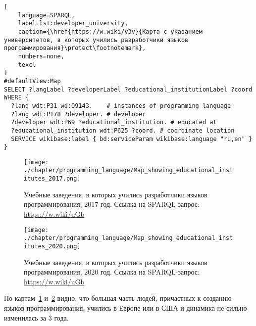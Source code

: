\begin{lstlisting}[
	language=SPARQL,
	label=lst:developer_university,
	caption={\href{https://w.wiki/v3v}{Карта с указанием университетов, в которых учились разработчики языков программирования}\protect\footnotemark},
    numbers=none,
	texcl
]
#defaultView:Map
SELECT ?langLabel ?developerLabel ?educational_institutionLabel ?coord WHERE {
  ?lang wdt:P31 wd:Q9143.    # instances of programming language
  ?lang wdt:P178 ?developer. # developer
  ?developer wdt:P69 ?educational_institution. # educated at
  ?educational_institution wdt:P625 ?coord. # coordinate location
  SERVICE wikibase:label { bd:serviceParam wikibase:language "ru,en" }
}
\end{lstlisting}

\begin{figure}[h]
\centering
	\texttt{[image: ./chapter/programming\_language/Map\_showing\_educational\_institutes\_2017.png]}
	\caption[Учебные заведения, в которых учились разработчики языков программирования, 2017 год.]{Учебные заведения, в которых учились разработчики языков программирования, 2017 год. Ссылка на SPARQL-запрос: \href{https://w.wiki/uGb}{https://w.wiki/uGb}}
	\label{fig:universities_2017}
\end{figure}
\begin{figure}[h]
\centering
	\texttt{[image: ./chapter/programming\_language/Map\_showing\_educational\_institutes\_2020.png]}
	\caption[Учебные заведения, в которых учились разработчики языков программирования, 2020 год.]{Учебные заведения, в которых учились разработчики языков программирования, 2020 год. Ссылка на SPARQL-запрос: \href{https://w.wiki/uGb}{https://w.wiki/uGb}}
	\label{fig:universities_2020}
\end{figure}

По картам~\ref{fig:universities_2017} и~\ref{fig:universities_2020} видно, что большая часть людей, причастных к созданию языков программирования, учились в Европе или в США и динамика не сильно изменилась за 3 года.

